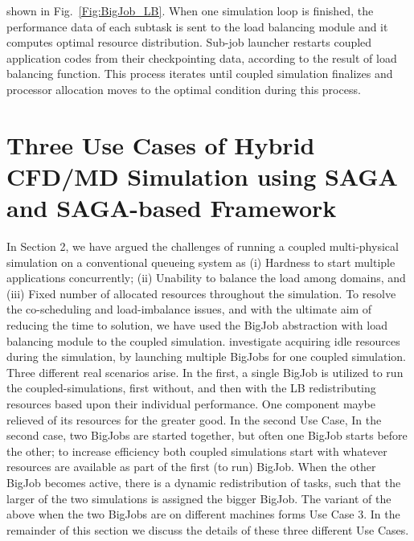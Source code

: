 \documentclass[conference,final]{IEEEtran}
\begin{document}

shown in Fig.~\ref{Fig:BigJob_LB}. When one simulation loop is finished, the performance 
data of each subtask is sent to the load balancing module and it computes optimal 
resource distribution. Sub-job launcher restarts coupled application codes from their 
checkpointing data, according to the result of load balancing function. This process 
iterates until coupled simulation finalizes and processor allocation moves to the optimal 
condition during this process.




\section{Three Use Cases of Hybrid CFD/MD Simulation using SAGA and SAGA-based Framework}

In Section 2, we have argued the challenges of running a coupled multi-physical 
simulation on a conventional queueing system as (i) Hardness to start multiple 
applications concurrently; (ii) Unability to balance the load among domains, and (iii) 
Fixed number of allocated resources throughout the simulation. To resolve the 
co-scheduling and load-imbalance issues, and with the ultimate aim of reducing the time 
to solution, we have used the BigJob abstraction with load balancing module to the 
coupled simulation. %
investigate acquiring idle resources during the simulation, by launching multiple BigJobs 
for one coupled simulation.
Three different real scenarios arise. In the first, a single BigJob is utilized to run 
the coupled-simulations, first without, and then with the LB redistributing resources 
based upon their individual performance. One component maybe relieved of its resources 
for the greater good. In the second Use Case, In the second case, two BigJobs are started 
together, but often one BigJob starts before the other; to increase efficiency both 
coupled simulations start with whatever resources are available as part of the first (to 
run) BigJob. When the other BigJob becomes active, there is a dynamic redistribution of 
tasks, such that
the larger of the two simulations is assigned the bigger BigJob. The variant of the above 
when
the two BigJobs are on different machines forms Use Case 3. In the remainder of this 
section we discuss
the details of these three different Use Cases.
\end{document}
